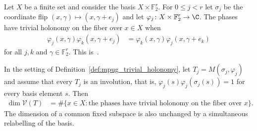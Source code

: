 \begin{definition}
    \label{def:mpug_trivial_holonomy}
    \leanok
    Let $X$ be a finite set and consider the basis $X\times\mathbb F_2^r$.
    For $0\leq j<r$ let $\sigma_j$ be the coordinate flip
    $(x,\gamma)\mapsto(x,\gamma+e_j)$ and let
    $\varphi_j\colon X\times\mathbb F_2^r\to\C$. The phases have trivial
    holonomy on the fiber over $x\in X$ when
    \begin{align}
        \varphi_j(x,\gamma)\varphi_k(x,\gamma+e_j)
         & =\varphi_k(x,\gamma)\varphi_j(x,\gamma+e_k)
        \label{eq:mpug_trivial_holonomy}
    \end{align}
    for all $j,k$ and $\gamma\in\mathbb F_2^r$.
    This is~\cite[``Trivial holonomy on a fiber'']{QICLean2026Blueprint}.
\end{definition}

\begin{lemma}
    \label{thm:mpug_monomial_fixed_space_criterion}
    \leanok
    In the setting of Definition~\ref{def:mpug_trivial_holonomy}, let
    $T_j=M(\sigma_j,\varphi_j)$ and assume that every $T_j$ is an involution,
    that is, $\varphi_j(s)\varphi_j(\sigma_j(s))=1$ for every basis element
    $s$. Then
    \begin{align}
        \dim\mathcal V(T)
         & =\#\{x\in X:\text{the phases have trivial holonomy on the fiber over }x\}.
        \label{eq:mpug_monomial_fixed_space_count}
    \end{align}
    The dimension of a common fixed subspace is also unchanged by a
    simultaneous relabelling of the basis.
\end{lemma}

